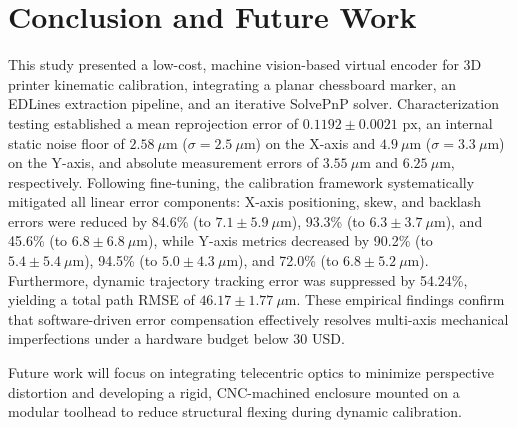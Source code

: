 \section{Conclusion and Future Work}
\label{conclusion}
This study presented a low-cost, machine vision-based virtual encoder for 3D printer kinematic calibration, integrating a planar chessboard marker, an EDLines extraction pipeline, and an iterative SolvePnP solver. Characterization testing established a mean reprojection error of $0.1192 \pm 0.0021\text{ px}$, an internal static noise floor of $2.58~\mu\text{m}$ ($\sigma = 2.5~\mu\text{m}$) on the X-axis and $4.9~\mu\text{m}$ ($\sigma = 3.3~\mu\text{m}$) on the Y-axis, and absolute measurement errors of $3.55~\mu\text{m}$ and $6.25~\mu\text{m}$, respectively. Following fine-tuning, the calibration framework systematically mitigated all linear error components: X-axis positioning, skew, and backlash errors were reduced by 84.6\% (to $7.1 \pm 5.9~\mu\text{m}$), 93.3\% (to $6.3 \pm 3.7~\mu\text{m}$), and 45.6\% (to $6.8 \pm 6.8~\mu\text{m}$), while Y-axis metrics decreased by 90.2\% (to $5.4 \pm 5.4~\mu\text{m}$), 94.5\% (to $5.0 \pm 4.3~\mu\text{m}$), and 72.0\% (to $6.8 \pm 5.2~\mu\text{m}$). Furthermore, dynamic trajectory tracking error was suppressed by 54.24\%, yielding a total path RMSE of $46.17 \pm 1.77~\mu\text{m}$. These empirical findings confirm that software-driven error compensation effectively resolves multi-axis mechanical imperfections under a hardware budget below 30 USD. 

Future work will focus on integrating telecentric optics to minimize perspective distortion and developing a rigid, CNC-machined enclosure mounted on a modular toolhead to reduce structural flexing during dynamic calibration.
